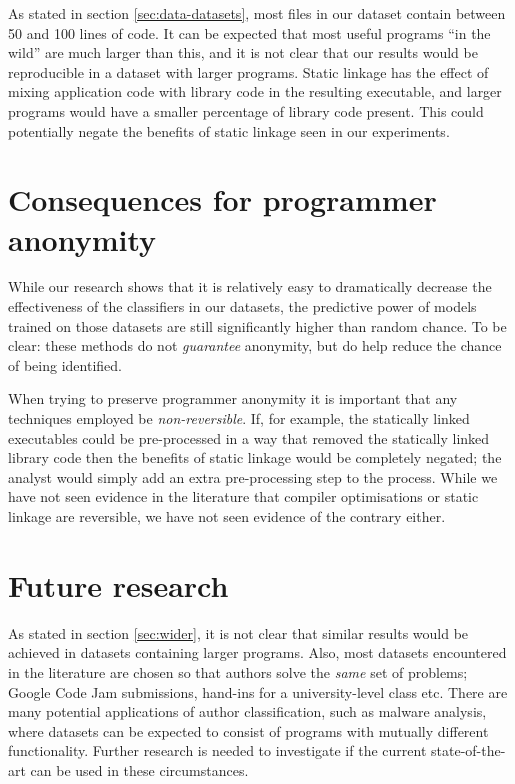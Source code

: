 \documentclass[a4paper,11pt]{kth-mag}
\begin{document}
As stated in section \ref{sec:data-datasets}, most files in our dataset contain
between 50 and 100 lines of code. It can be expected that most useful programs
``in the wild'' are much larger than this, and it is not clear that our results
would be reproducible in a dataset with larger programs. Static linkage has the
effect of mixing application code with library code in the resulting
executable, and larger programs would have a smaller percentage of library code
present. This could potentially negate the benefits of static linkage seen in
our experiments.

\section{Consequences for programmer anonymity}
While our research shows that it is relatively easy to dramatically decrease the
effectiveness of the classifiers in our datasets, the predictive power of
models trained on those datasets are still significantly higher than random
chance. To be clear: these methods do not \emph{guarantee} anonymity, but do
help reduce the chance of being identified.

When trying to preserve programmer anonymity it is important that any
techniques employed be \emph{non-reversible}. If, for example, the statically
linked executables could be pre-processed in a way that removed the statically
linked library code then the benefits of static linkage would be completely
negated; the analyst would simply add an extra pre-processing step to the
process. While we have not seen evidence in the literature that compiler
optimisations or static linkage are reversible, we have not seen evidence of
the contrary either.

\section{Future research}
As stated in section \ref{sec:wider}, it is not clear that similar results
would be achieved in datasets containing larger programs. Also, most datasets
encountered in the literature are chosen so that authors solve the \emph{same}
set of problems; Google Code Jam submissions, hand-ins for a university-level
class etc. There are many potential applications of author classification, such
as malware analysis, where datasets can be expected to consist of programs with
mutually different functionality. Further research is needed to investigate if
the current state-of-the-art can be used in these circumstances. 
\end{document}
